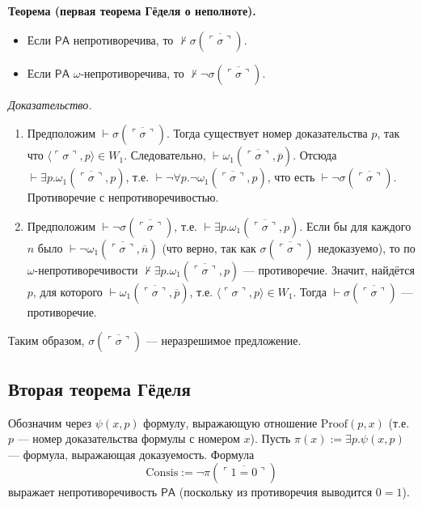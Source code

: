 \documentclass[10pt]{article}
\begin{document}
\textbf{Теорема (первая теорема Гёделя о неполноте).}
\begin{itemize}
  \item Если $\mathsf{PA}$ непротиворечива, то $\not\vdash\sigma(\overline{\ulcorner\sigma\urcorner})$.
  \item Если $\mathsf{PA}$ $\omega$-непротиворечива, то $\not\vdash\neg\sigma(\overline{\ulcorner\sigma\urcorner})$.
\end{itemize}
\emph{Доказательство.}
\begin{enumerate}
  \item Предположим $\vdash\sigma(\overline{\ulcorner\sigma\urcorner})$. Тогда существует номер доказательства $p$, так что $\langle\ulcorner\sigma\urcorner,p\rangle\in W_1$. Следовательно, $\vdash\omega_1(\overline{\ulcorner\sigma\urcorner},\overline{p})$. Отсюда $\vdash\exists p.\omega_1(\overline{\ulcorner\sigma\urcorner},p)$, т.е. $\vdash\neg\forall p.\neg\omega_1(\overline{\ulcorner\sigma\urcorner},p)$, что есть $\vdash\neg\sigma(\overline{\ulcorner\sigma\urcorner})$. Противоречие с непротиворечивостью.
  \item Предположим $\vdash\neg\sigma(\overline{\ulcorner\sigma\urcorner})$, т.е. $\vdash\exists p.\omega_1(\overline{\ulcorner\sigma\urcorner},p)$. Если бы для каждого $n$ было $\vdash\neg\omega_1(\overline{\ulcorner\sigma\urcorner},\overline{n})$ (что верно, так как $\sigma(\overline{\ulcorner\sigma\urcorner})$ недоказуемо), то по $\omega$-непротиворечивости $\not\vdash\exists p.\omega_1(\overline{\ulcorner\sigma\urcorner},p)$ — противоречие. Значит, найдётся $p$, для которого $\vdash\omega_1(\overline{\ulcorner\sigma\urcorner},\overline{p})$, т.е. $\langle\ulcorner\sigma\urcorner,p\rangle\in W_1$. Тогда $\vdash\sigma(\overline{\ulcorner\sigma\urcorner})$ — противоречие.
\end{enumerate}
Таким образом, $\sigma(\overline{\ulcorner\sigma\urcorner})$ — неразрешимое предложение.

\subsection{Вторая теорема Гёделя}
Обозначим через $\psi(x,p)$ формулу, выражающую отношение $\mathrm{Proof}(p,x)$ (т.е. $p$ — номер доказательства формулы с номером $x$). Пусть $\pi(x) := \exists p.\psi(x,p)$ — формула, выражающая доказуемость. Формула
\[
\mathrm{Consis} := \neg\pi(\overline{\ulcorner 1=0\urcorner})
\]
выражает непротиворечивость $\mathsf{PA}$ (поскольку из противоречия выводится $0=1$).
\end{document}
